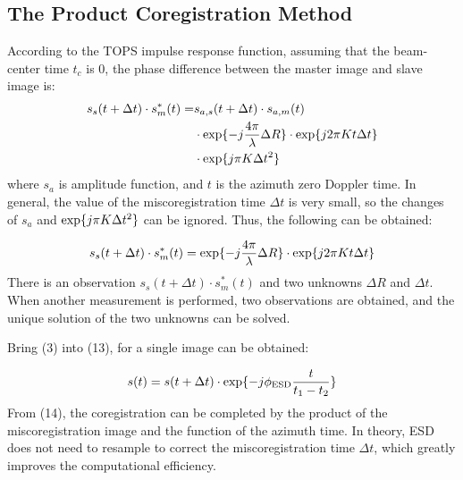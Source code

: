 \documentclass[a4paper,fleqn]{cas-dc}
\begin{document}
\subsection{The Product Coregistration Method}
According to the TOPS impulse response function, assuming that the beam-center time $t_c$ is 0, the phase difference between the master image and slave image is:
\begin{equation}
\begin{split}
s_s(t + \Delta t) \cdot s_m^*(t) = & s_{a, s}(t + \Delta t) \cdot s_{a, m}(t)  \\
& \cdot {\rm exp} \{-j \frac{4 \pi}{\lambda} \Delta R\} \cdot {\rm exp} \{j 2 \pi K t \Delta t\} \\
& \cdot {\rm exp} \{ j \pi K \Delta t^2\}
\end{split}
\end{equation}
\noindent where $s_a$ is amplitude function, and $t$ is the azimuth zero Doppler time. In general, the value of the miscoregistration time $\Delta t$ is very small, so the changes of $s_a$ and ${\rm exp} \{ j \pi K \Delta t^2\}$ can be ignored. Thus, the following can be obtained: \par
\begin{equation}
    s_s(t + \Delta t) \cdot s_m^*(t) = {\rm exp} \{-j \frac{4 \pi}{\lambda} \Delta R\} \cdot {\rm exp} \{j 2 \pi K t \Delta t\}
\end{equation}
\noindent There is an observation $s_s(t + \Delta t) \cdot s_m^*(t)$ and two unknowns $\Delta R$ and $\Delta t$. When another measurement is performed, two observations are obtained, and the unique solution of the two unknowns can be solved. \par
Bring (3) into (13), for a single image can be obtained: \par
\begin{equation}
    s(t) = s(t + \Delta t) \cdot {\rm exp} \{-j \phi_{\rm ESD} \frac{t}{t_1 - t_2}\} 
\end{equation}
\noindent From (14), the coregistration can be completed by the product of the miscoregistration image and the function of the azimuth time. In theory, ESD does not need to resample to correct the miscoregistration time $\Delta t$, which greatly improves the computational efficiency.
\end{document}
